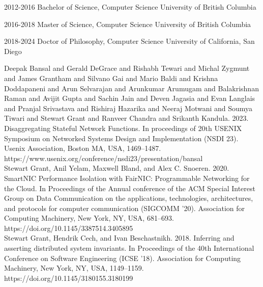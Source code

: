 \documentclass[12pt]{ucsddissertation}
\begin{document}
\begin{vita}
\noindent
\begin{cv}{}
\begin{cvlist}{}
\item[2012-2016] Bachelor of Science, Computer Science University of British Columbia
\item[2016-2018] Master of Science, Computer Science University of British Columbia
\item[2018-2024] Doctor of Philosophy, Computer Science University of California, San Diego
\end{cvlist}
\end{cv}

\publications

\noindent Deepak Bansal and Gerald DeGrace and Rishabh Tewari and Michal Zygmunt and James Grantham
and Silvano Gai and Mario Baldi and Krishna Doddapaneni and Arun Selvarajan and Arunkumar Arumugam
and Balakrishnan Raman and Avijit Gupta and Sachin Jain and Deven Jagasia and Evan Langlais and
Pranjal Srivastava and Rishiraj Hazarika and Neeraj Motwani and Soumya Tiwari and Stewart Grant and
Ranveer Chandra and Srikanth Kandula. 2023. Disaggregating Stateful Network Functions. In
proceedings of 20th USENIX Symposium on Networked Systems Design and Implementation (NSDI 23).
Usenix Association, Boston MA, USA, 1469--1487.
https://www.usenix.org/conference/nsdi23/presentation/bansal \\

\noindent Stewart Grant, Anil Yelam, Maxwell Bland, and Alex C. Snoeren. 2020. SmartNIC Performance
Isolation with FairNIC: Programmable Networking for the Cloud. In Proceedings of the Annual
conference of the ACM Special Interest Group on Data Communication on the applications,
technologies, architectures, and protocols for computer communication (SIGCOMM '20). Association for
Computing Machinery, New York, NY, USA, 681–693. https://doi.org/10.1145/3387514.3405895 \\

\noindent Stewart Grant, Hendrik Cech, and Ivan Beschastnikh. 2018. Inferring and asserting
distributed system invariants. In Proceedings of the 40th International Conference on Software
Engineering (ICSE '18). Association for Computing Machinery, New York, NY, USA, 1149–1159.
https://doi.org/10.1145/3180155.3180199 \\

{}

\end{vita}
\end{document}
